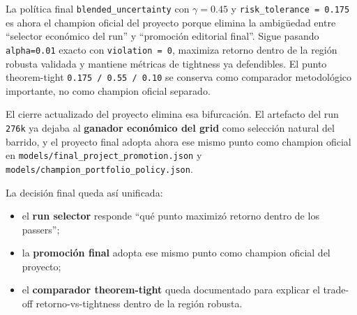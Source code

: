\documentclass[
  spanish,
  11pt,
  letterpaper,
]{scrbook}
\providecommand{\tightlist}{%
  \setlength{\itemsep}{0pt}\setlength{\parskip}{0pt}}
\theoremstyle{plain}
\theoremstyle{remark}
\begin{document}
\begin{tcolorbox}[enhanced jigsaw, arc=.35mm, bottomrule=.15mm, bottomtitle=1mm, breakable, colback=white, colbacktitle=quarto-callout-note-color!10!white, colframe=quarto-callout-note-color-frame, coltitle=black, left=2mm, leftrule=.75mm, opacityback=0, opacitybacktitle=0.6, rightrule=.15mm, title=\textcolor{quarto-callout-note-color}{\faInfo}\hspace{0.5em}{Interpretacion de la politica champion}, titlerule=0mm, toprule=.15mm, toptitle=1mm]

La política final \texttt{blended\_uncertainty} con \(\gamma = 0.45\) y
\texttt{risk\_tolerance\ =\ 0.175} es ahora el champion oficial del
proyecto porque elimina la ambigüedad entre ``selector económico del
run'' y ``promoción editorial final''. Sigue pasando \texttt{alpha=0.01}
exacto con \texttt{violation\ =\ 0}, maximiza retorno dentro de la
región robusta validada y mantiene métricas de tightness ya defendibles.
El punto theorem-tight \texttt{0.175\ /\ 0.55\ /\ 0.10} se conserva como
comparador metodológico importante, no como champion oficial separado.

\end{tcolorbox}

\begin{tcolorbox}[enhanced jigsaw, arc=.35mm, bottomrule=.15mm, bottomtitle=1mm, breakable, colback=white, colbacktitle=quarto-callout-warning-color!10!white, colframe=quarto-callout-warning-color-frame, coltitle=black, left=2mm, leftrule=.75mm, opacityback=0, opacitybacktitle=0.6, rightrule=.15mm, title=\textcolor{quarto-callout-warning-color}{\faExclamationTriangle}\hspace{0.5em}{Unificacion del selector y la promoción final}, titlerule=0mm, toprule=.15mm, toptitle=1mm]

El cierre actualizado del proyecto elimina esa bifurcación. El artefacto
del run \texttt{276k} ya dejaba al \textbf{ganador económico del grid}
como selección natural del barrido, y el proyecto final adopta ahora ese
mismo punto como champion oficial en
\texttt{models/final\_project\_promotion.json} y
\texttt{models/champion\_portfolio\_policy.json}.

La decisión final queda así unificada:

\begin{itemize}
\tightlist
\item
  el \textbf{run selector} responde ``qué punto maximizó retorno dentro
  de los passers'';
\item
  la \textbf{promoción final} adopta ese mismo punto como champion
  oficial del proyecto;
\item
  el \textbf{comparador theorem-tight} queda documentado para explicar
  el trade-off retorno-vs-tightness dentro de la región robusta.
\end{itemize}

\end{tcolorbox}
\end{document}
